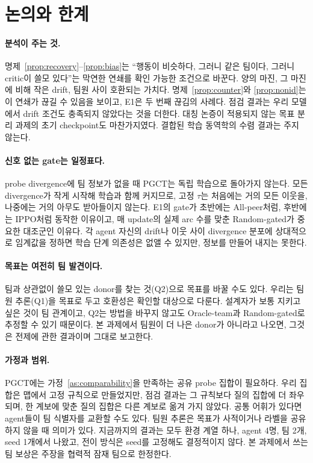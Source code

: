 \documentclass[twocolumn,10pt]{article}
\theoremstyle{remark}
\newcommand{\ours}{PGCT}
\begin{document}
\section{논의와 한계}
\paragraph{분석이 주는 것.} 명제~\ref{prop:recovery}--\ref{prop:bias}는 ``행동이 비슷하다, 그러니 같은 팀이다, 그러니 critic이
쓸모 있다''는 막연한 연쇄를 확인 가능한 조건으로 바꾼다. 양의 마진, 그 마진에 비해 작은 drift, 팀원 사이 호환되는 가치다.
명제~\ref{prop:counter}와 \ref{prop:nonid}는 이 연쇄가 끊길 수 있음을 보이고, E1은 두 번째 끊김의 사례다. 점검 결과는 우리
모델에서 drift 조건도 충족되지 않았다는 것을 더한다. 대칭 논증이 적용되지 않는 목표 분리 과제의 초기 checkpoint도 마찬가지였다.
결합된 학습 동역학의 수렴 결과는 주지 않는다.

\paragraph{신호 없는 gate는 일정표다.} probe divergence에 팀 정보가 없을 때 \ours{}는 독립 학습으로 돌아가지 않는다. 모든
divergence가 작게 시작해 학습과 함께 커지므로, 고정 $\tau$는 처음에는 거의 모든 이웃을, 나중에는 거의 아무도 받아들이지 않는다.
E1의 gate가 초반에는 All-peer처럼, 후반에는 IPPO처럼 동작한 이유이고, 매 update의 실제 arc 수를 맞춘 Random-gated가 중요한
대조군인 이유다. 각 agent 자신의 drift나 이웃 사이 divergence 분포에 상대적으로 임계값을 정하면 학습 단계 의존성은 없앨 수 있지만,
정보를 만들어 내지는 못한다.

\paragraph{목표는 여전히 팀 발견이다.} 팀과 상관없이 쓸모 있는 donor를 찾는 것(Q2)으로 목표를 바꿀 수도 있다. 우리는 팀원
추론(Q1)을 목표로 두고 호환성은 확인할 대상으로 다룬다. 설계자가 보통 지키고 싶은 것이 팀 관계이고, Q2는 방법을 바꾸지 않고도
Oracle-team과 Random-gated로 추정할 수 있기 때문이다. 본 과제에서 팀원이 더 나은 donor가 아니라고 나오면, 그것은 전제에 관한
결과이며 그대로 보고한다.

\paragraph{가정과 범위.} \ours{}에는 가정~\ref{as:comparability}을 만족하는 공유 probe 집합이 필요하다. 우리 집합은 맵에서 고정
규칙으로 만들었지만, 점검 결과는 그 규칙보다 질의 집합에 더 좌우되며, 한 계보에 맞춘 질의 집합은 다른 계보로 옮겨 가지 않았다.
공통 어휘가 있다면 agent들이 팀 식별자를 교환할 수도 있다. 팀원 추론은 목표가 사적이거나 라벨을 공유하지 않을 때 의미가 있다.
지금까지의 결과는 모두 환경 계열 하나, agent 4명, 팀 2개, seed 1개에서 나왔고, 전이 방식은 seed를 고정해도 결정적이지 않다. 본
과제에서 쓰는 팀 보상은 주장을 협력적 잠재 팀으로 한정한다.
\end{document}
